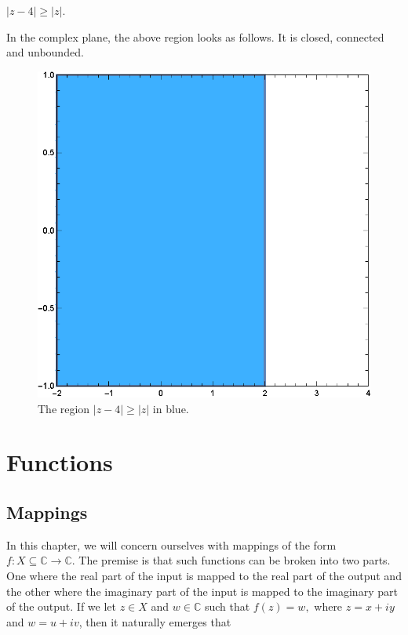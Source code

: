 \documentclass[12pt]{book}
\begin{document}
\begin{exmp}
    $|z - 4| \geq |z|.$
\end{exmp}
In the complex plane, the above region looks as follows. It is closed, connected and unbounded.
\begin{figure}[H]
    \centering
    \includegraphics[scale = 0.7]{./figs/chapter_1/region_plot_4.eps}
    \caption{The region $|z - 4| \geq |z|$ in blue.}
\end{figure}

\chapter{Functions}
\section{Mappings}
In this chapter, we will concern ourselves with mappings of the form $f: X \subseteq \mathbb{C} \rightarrow \mathbb{C}.$ The premise is that such functions can be broken into two parts. One where the real part of the input is mapped to the real part of the output and the other where the imaginary part of the input is mapped to the imaginary part of the output. If we let $z \in X$ and  $w \in \mathbb{C}$ such that $f(z) = w,$ where $z = x + iy$ and $w = u + iv$, then it naturally emerges that
\end{document}
